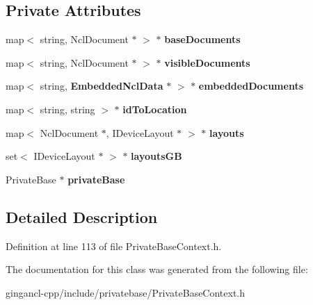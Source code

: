 \subsection*{Private Attributes}
\begin{CompactItemize}
\item 
map$<$ string, NclDocument $\ast$ $>$ $\ast$ {\bf baseDocuments}\label{classbr_1_1pucrio_1_1telemidia_1_1ginga_1_1ncl_1_1PrivateBaseContext_16f91ad22f8115c752d9246ca060ce1a}

\item 
map$<$ string, NclDocument $\ast$ $>$ $\ast$ {\bf visibleDocuments}\label{classbr_1_1pucrio_1_1telemidia_1_1ginga_1_1ncl_1_1PrivateBaseContext_39c1cbd75659d5612421be0db4b4c2eb}

\item 
map$<$ string, {\bf EmbeddedNclData} $\ast$ $>$ $\ast$ {\bf embeddedDocuments}\label{classbr_1_1pucrio_1_1telemidia_1_1ginga_1_1ncl_1_1PrivateBaseContext_c00a4fc41835c4235f4614929791d226}

\item 
map$<$ string, string $>$ $\ast$ {\bf idToLocation}\label{classbr_1_1pucrio_1_1telemidia_1_1ginga_1_1ncl_1_1PrivateBaseContext_ef934cb37d8e23713b4ff609ae966e22}

\item 
map$<$ NclDocument $\ast$, IDeviceLayout $\ast$ $>$ $\ast$ {\bf layouts}\label{classbr_1_1pucrio_1_1telemidia_1_1ginga_1_1ncl_1_1PrivateBaseContext_f62ea6b0c82e2fbe423a1a1c0ae431ad}

\item 
set$<$ IDeviceLayout $\ast$ $>$ $\ast$ {\bf layoutsGB}\label{classbr_1_1pucrio_1_1telemidia_1_1ginga_1_1ncl_1_1PrivateBaseContext_43bb6f663d2158ddf478823175576c2d}

\item 
PrivateBase $\ast$ {\bf privateBase}\label{classbr_1_1pucrio_1_1telemidia_1_1ginga_1_1ncl_1_1PrivateBaseContext_e5995716b77e5c52a1bdac19bba128dd}

\end{CompactItemize}


\subsection{Detailed Description}




Definition at line 113 of file PrivateBaseContext.h.

The documentation for this class was generated from the following file:\begin{CompactItemize}
\item 
gingancl-cpp/include/privatebase/PrivateBaseContext.h\end{CompactItemize}
